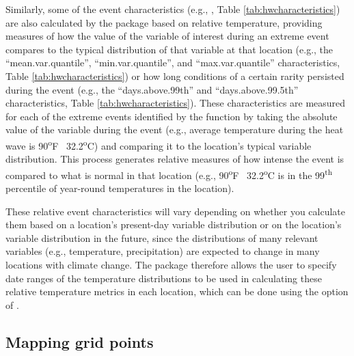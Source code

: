 Similarly, some of the event characteristics (e.g.,
, Table \ref{tab:hwcharacteristics}) are also
calculated by the package based on relative temperature, providing
measures of how the value of the variable of interest during an extreme
event compares to the typical distribution of that variable at that
location (e.g., the ``mean.var.quantile'', ``min.var.quantile'', and
``max.var.quantile'' characteristics, Table \ref{tab:hwcharacteristics})
or how long conditions of a certain rarity persisted during the event
(e.g., the ``days.above.99th'' and ``days.above.99.5th''
characteristics, Table \ref{tab:hwcharacteristics}). These
characteristics are measured for each of the extreme events identified
by the  function by taking the absolute value of the
variable during the event (e.g., average temperature during the heat
wave is 90\textsuperscript{o}F ~32.2\textsuperscript{o}C) and comparing
it to the location's typical variable distribution. This process
generates relative measures of how intense the event is compared to what
is normal in that location (e.g., 90\textsuperscript{o}F
~32.2\textsuperscript{o}C is in the 99\textsuperscript{th} percentile of
year-round temperatures in the location).

These relative event characteristics will vary depending on whether you
calculate them based on a location's present-day variable distribution
or on the location's variable distribution in the future, since the
distributions of many relevant variables (e.g., temperature,
precipitation) are expected to change in many locations with climate
change. The package therefore allows the user to specify date ranges of
the temperature distributions to be used in calculating these relative
temperature metrics in each location, which can be done using the
 option of .

\subsection{Mapping grid points}\label{mapping-grid-points}

